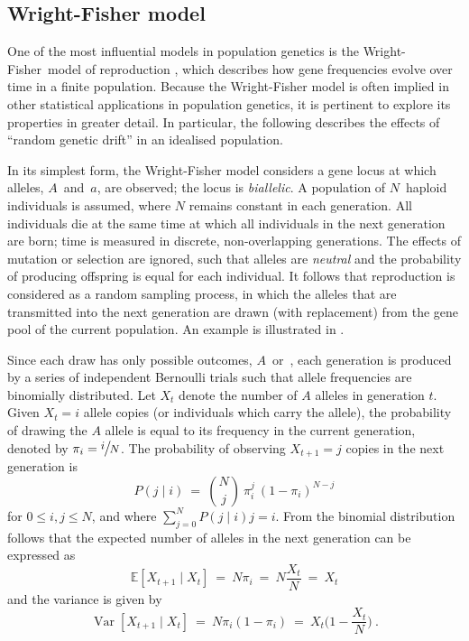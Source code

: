 %
\subsection{Wright-Fisher model}
%

One of the most influential models in population genetics is the Wright-Fisher~model of reproduction \citep{Fisher1930,Wright1931}, which describes how gene frequencies evolve over time in a finite population.
Because the Wright-Fisher model is often implied in other statistical applications in population genetics, it is pertinent to explore its properties in greater detail.
In particular, the following describes the effects of ``random genetic drift'' in an idealised population.

%

%

In its simplest form, the Wright-Fisher model considers a gene locus at which  alleles, $A$~and~$a$, are observed; \ie the locus is \emph{biallelic}.
A population of $N$~haploid individuals is assumed, where $N$ remains constant in each generation.
All individuals die at the same time at which all individuals in the next generation are born; \ie time is measured in discrete, non-overlapping generations.
The effects of mutation or selection are ignored, such that alleles are \emph{neutral} and the probability of producing offspring is equal for each individual.
It follows that reproduction is considered as a random sampling process, in which the alleles that are transmitted into the next generation are drawn (with replacement) from the gene pool of the current population.
An example is illustrated in .

Since each draw has only  possible outcomes, $A$~or~, each generation is produced by a series of independent Bernoulli trials such that allele frequencies are binomially distributed.
Let $X_t$ denote the number of $A$ alleles in generation $t$.
Given ${X_t=i}$ allele copies (or individuals which carry the allele),
the probability of drawing the $A$ allele is equal to its frequency in the current generation, denoted by ${\pi_i = \large \sfrac{i}{N}}$.
The probability of observing ${X_{t+1}=j}$ copies in the next generation is
\begin{equation}\label{eq:WFprob}
	P(j \mid i) ~=~ {{N}\choose{j}} ~ \pi_i^j ~ (1 - \pi_i)^{N-j}
\end{equation}
for ${0 \leq i,j \leq N}$, and where ${\sum_{j=0}^{N} P(j \mid i) j = i}$.
From the binomial distribution follows that the expected number of alleles in the next generation can be expressed as
\begin{equation}\label{eq:WFexp}
	\mathbb{E}[X_{t+1} \mid X_{t}] ~=~ N \pi_i ~=~ N \frac{X_t}{N} ~=~ X_t
\end{equation}
and the variance is given by
\begin{equation}\label{eq:WFvar}
	\operatorname{Var}[X_{t+1} \mid X_{t}] ~=~ N \pi_i (1 - \pi_i) ~=~ X_t \Big( 1 - \frac{X_t}{N} \Big)
	\ \text{.}
\end{equation}

